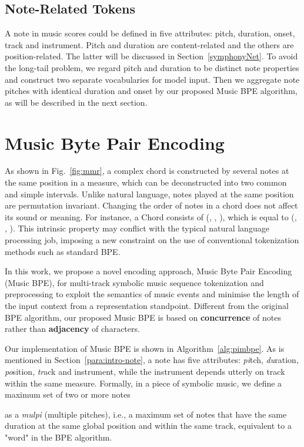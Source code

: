 \documentclass{article}
\begin{document}
\subsection{Note-Related Tokens}
A note in music scores could be defined in five attributes: pitch, duration, onset, track and instrument. Pitch and duration are content-related and the others are position-related. The latter will be discussed in Section~\ref{symphonyNet}. To avoid the long-tail problem, we regard pitch and duration to be distinct note properties and construct two separate vocabularies for model input. Then we aggregate note pitches with identical duration and onset by our proposed Music BPE algorithm, as will be described in the next section.

\section{Music Byte Pair Encoding} 
\label{Music BPE}
As shown in Fig.~\ref{fig:mmr}, a complex chord is constructed by several notes at the same position in a measure, which can be deconstructed into two common and simple intervals. Unlike natural language, notes played at the same position are permutation invariant. Changing the order of notes in a chord does not affect its sound or meaning. For instance, a Chord  consists of (, , ), which is equal to (, , ). This intrinsic property may conflict with the typical natural language processing job, imposing a new constraint on the use of conventional tokenization methods such as standard BPE.

In this work, we propose a novel encoding approach, Music Byte Pair Encoding (Music BPE), for multi-track symbolic music sequence tokenization and preprocessing to exploit the semantics of music events and minimise the length of the input context from a representation standpoint. Different from the original BPE algorithm, our proposed Music BPE is based on \textbf{concurrence} of notes rather than \textbf{adjacency} of characters.

Our implementation of Music BPE is shown in Algorithm~\ref{alg:pimbpe}. As is mentioned in Section~\ref{para:intro-note}, a note has five attributes: \emph{pi}tch, \emph{du}ration, \emph{po}sition, \emph{tr}ack and instrument, while the instrument depends utterly on track within the same measure. Formally, in a piece of symbolic music, we define a maximum set of two or more notes 

as a \emph{mulpi} (multiple pitches), i.e., a maximum set of notes that have the same duration at the same global position and within the same track, equivalent to a "word" in the BPE algorithm.
\end{document}
